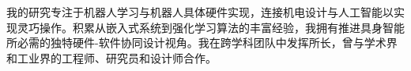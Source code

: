 
\vspace{-8mm}

\begin{cvparagraph}
我的研究专注于机器人学习与机器人具体硬件实现，连接机电设计与人工智能以实现灵巧操作。积累从嵌入式系统到强化学习算法的丰富经验，我拥有推进具身智能所必需的独特硬件-软件协同设计视角。我在跨学科团队中发挥所长，曾与学术界和工业界的工程师、研究员和设计师合作。

\vspace{-5mm}
\end{cvparagraph}